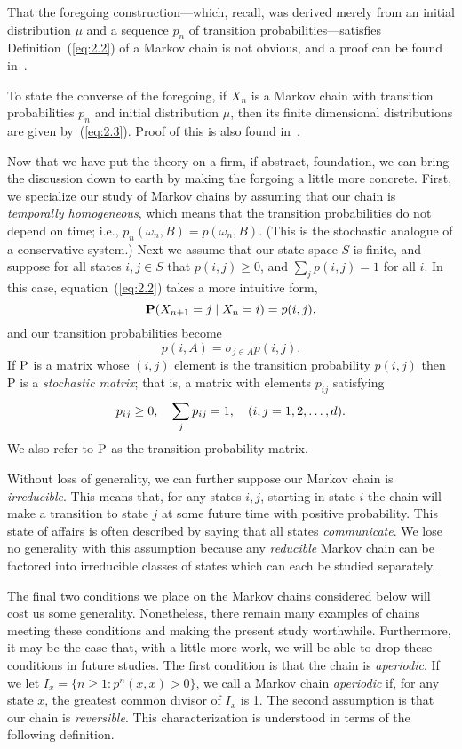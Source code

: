 That the foregoing construction---which, recall, was derived merely from an
initial distribution $\mu$ and a sequence $p_n$ of transition
probabilities---satisfies Definition~(\ref{eq:2.2}) of a Markov chain is not
obvious, and a proof can be found in~\cite{Durret:1996}.

To state the converse of the foregoing, if $X_n$ is a Markov chain with
transition probabilities $p_n$ and initial distribution $\mu$, then its finite
dimensional distributions are given by~(\ref{eq:2.3}). Proof of this is also found
in~\cite{Durret:1996}. 

Now that we have put the theory on a firm, if abstract, foundation, we can bring
the discussion down to earth by making the forgoing a little more
concrete. First, we specialize our study of Markov chains by assuming that our
chain is \emph{temporally homogeneous}, which means that the transition
probabilities do not depend on time; i.e., 
$p_n(\omega_n, B) = p(\omega_n, B)$. (This is the stochastic analogue of a
conservative system.) 
Next we assume that our state space $S$ is finite, and suppose for all states
$i,j \in S$ that $p(i, j) \geq 0$, and $\sum_j p(i, j) = 1$ for all $i$. In
this case, equation~(\ref{eq:2.2}) takes a more intuitive form,
\[
\bP(X_{n+1}=j \mid X_n = i) =p(i,j),
\]
and our transition probabilities become
\[
p(i,A) = \sigma_{j\in A} p(i,j).
\]
If $\P$ is a matrix whose $(i, j)$ element is the transition probability 
$p(i, j)$ then P is a \emph{stochastic matrix}; that is, a matrix with elements
$p_{ij}$ satisfying 
\[
\pij \geq 0, \quad \sum_j \pij =1, \quad (i, j =1, 2, \dots, d).
\]
We also refer to $\P$ as the transition probability matrix.

Without loss of generality, we can further suppose our Markov chain is \emph{irreducible}. This
means that, for any states $i, j$, starting in state $i$ the chain will make a
transition to state $j$ at some future time with positive probability. This
state of affairs is often described by saying that all states \emph{communicate}. We
lose no generality with this assumption because any \emph{reducible} Markov chain can
be factored into irreducible classes of states which can each be studied
separately. 

The final two conditions we place on the Markov chains considered below will cost us
some generality. Nonetheless, there remain many examples of chains meeting these conditions
and making the present study worthwhile. Furthermore, it may be the case that, with a little
more work, we will be able to drop these conditions in future studies. The first condition is that
the chain is \emph{aperiodic}. If we let $I_x = \{n \geq 1: p^n(x,x) > 0\}$, we
call a Markov chain \emph{aperiodic} if, for any state $x$, the greatest common
divisor of $I_x$ is 1. The second assumption is that our chain is 
\emph{reversible}. This characterization is understood in terms of the following definition.

